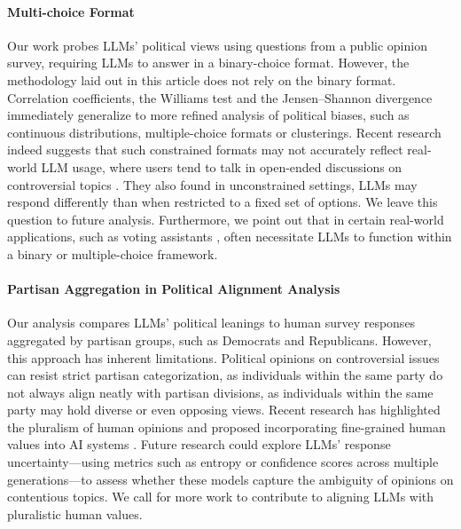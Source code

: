 \paragraph{Multi-choice Format} 
Our work probes LLMs' political views using questions from a public opinion survey, requiring LLMs to answer in a binary-choice format. However, the methodology laid out in this article does not rely on the binary format. Correlation coefficients, the Williams test and the Jensen--Shannon divergence immediately generalize to more refined analysis of political biases, such as continuous distributions, multiple-choice formats or clusterings. Recent research \cite{rottger-etal-2024-political} indeed suggests that such constrained formats may not accurately reflect real-world LLM usage, where users tend to talk in open-ended discussions on controversial topics \cite{ouyang-etal-2023-shifted}. They also found in unconstrained settings, LLMs may respond differently than when restricted to a fixed set of options. We leave this question to future analysis. Furthermore, we point out that in certain real-world applications, such as voting assistants \cite{chalkidis-2024-investigating}, often necessitate LLMs to function within a binary or multiple-choice framework. 


\paragraph{Partisan Aggregation in Political Alignment Analysis}
Our analysis compares LLMs’ political leanings to human survey responses aggregated by partisan groups, such as Democrats and Republicans. However, this approach has inherent limitations. Political opinions on controversial issues can resist strict partisan categorization, as individuals within the same party do not always align neatly with partisan divisions, as individuals within the same party may hold diverse or even opposing views. Recent research has highlighted the pluralism of human opinions and proposed incorporating fine-grained human values into AI systems \cite{plank-2022-problem, xu-etal-2024-lens,pmlr-v235-sorensen24a}. Future research could explore LLMs’ response uncertainty—using metrics such as entropy or confidence scores across multiple generations—to assess whether these models capture the ambiguity of opinions on contentious topics. We call for more work to contribute to aligning LLMs with pluralistic human values.

